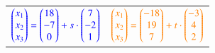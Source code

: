 		

\begin{tabular}{ll}
	${\color{blue}\begin{pmatrix} x_1 \\ x_2 \\ x_3 \end{pmatrix} = 
	\begin{pmatrix} 18 \\ -7 \\ 0 \end{pmatrix} + s \cdot 
	\begin{pmatrix} 7 \\ -2 \\ 1\end{pmatrix}}$
	& 
	${\color{orange}\begin{pmatrix} x_1 \\ x_2 \\ x_3 \end{pmatrix} = 
	\begin{pmatrix} -18 \\ 19 \\ 7 \end{pmatrix} + t \cdot 
	\begin{pmatrix} -3 \\ 4 \\ 2\end{pmatrix}}$ 
\end{tabular}

\vspace{0.2cm}
	
